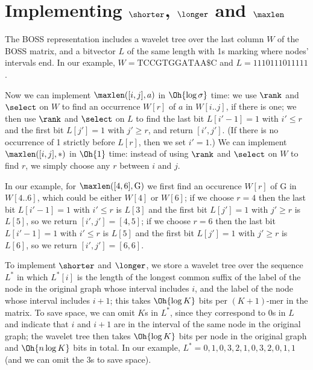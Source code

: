 \section{Implementing $\shorter$, $\longer$ and $\maxlen$}
\label{sec:implementing}

The BOSS representation includes a wavelet tree over the last column $W$ of the BOSS matrix, and a bitvector $L$ of the same length with 1s marking where nodes' intervals end.  In our example, \(W = \mathrm{TCCGTGGATAA\$C}\) and \(L = 1110111011111\).

Now we can implement \(\maxlen([i, j], a)\) in $\Oh{\log \sigma}$ time: we use $\rank$ and $\select$ on $W$ to find an occurrence \(W [r]\) of $a$ in \(W [i..j]\), if there is one; we then use $\rank$ and $\select$ on $L$ to find the last bit \(L [i' - 1] = 1\) with \(i' \leq r\) and the first bit \(L [j'] = 1\) with \(j' \geq r\), and return \([i', j']\).  (If there is no occurrence of 1 strictly before \(L [r]\), then we set \(i' = 1\).)  We can implement \(\maxlen([i, j], *)\) in $\Oh{1}$ time: instead of using $\rank$ and $\select$ on $W$ to find $r$, we simply choose any $r$ between $i$ and $j$.

In our example, for \(\maxlen([4, 6], \mathrm{G})\) we first find an occurence \(W [r]\) of G in \(W [4..6]\), which could be either \(W [4]\) or \(W [6]\); if we choose \(r = 4\) then the last bit \(L [i' - 1] = 1\) with \(i' \leq r\) is \(L [3]\) and the first bit \(L [j'] = 1\) with \(j' \geq r\) is \(L [5]\), so we return \([i', j'] = [4, 5]\); if we choose \(r = 6\) then the last bit \(L [i' - 1] = 1\) with \(i' \leq r\) is \(L [5]\) and the first bit \(L [j'] = 1\) with \(j' \geq r\) is \(L [6]\), so we return \([i', j'] = [6, 6]\).

To implement $\shorter$ and $\longer$, we store a wavelet tree over the sequence $L^*$ in which \(L^* [i]\) is the length of the longest common suffix of the label of the node in the original graph whose interval includes $i$, and the label of the node whose interval includes \(i + 1\); this takes $\Oh{\log K}$ bits per \((K + 1)\)-mer in the matrix.  To save space, we can omit $K$s in $L^*$, since they correspond to 0s in $L$ and indicate that $i$ and \(i + 1\) are in the interval of the same node in the original graph; the wavelet tree then takes $\Oh{\log K}$ bits per node in the original graph and $\Oh{n \log K}$ bits in total.  In our example, \(L^* = 0, 1, 0, 3, 2, 1, 0, 3, 2, 0, 1, 1\) (and we can omit the 3s to save space).

